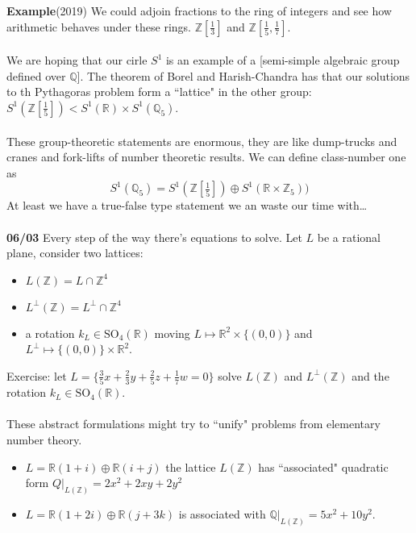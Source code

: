 \documentclass[12pt]{article}
\begin{document}
{\noindent \textbf{Example}(2019) We could adjoin fractions to the ring of integers and see how arithmetic behaves under these rings.  $\mathbb{Z}[\frac{1}{3}]$ and $\mathbb{Z}[\frac{1}{5}, \frac{1}{7}]$.  \\ \\
We are hoping that our cirle $S^1$ is an example of a [semi-simple algebraic group defined over $\mathbb{Q}$].  The theorem of Borel and Harish-Chandra has that our solutions to th Pythagoras problem form a ``lattice" in the other group: $S^1(\mathbb{Z}[\frac{1}{5}]) < S^1(\mathbb{R}) \times S^1(\mathbb{Q}_5)$. \\ \\
These group-theoretic statements are enormous, they are like dump-trucks and cranes and fork-lifts of number theoretic results.  We can define {\color{green!70!black} class-number one} as 
$$ S^1(\mathbb{Q}_5) = S^1(\mathbb{Z}[\tfrac{1}{5}]) \oplus  S^1(\mathbb{R} \times \mathbb{Z}_5)) $$
At least we have a true-false type statement we an waste our time with\dots \\ \\
\textbf{06/03} Every step of the way there's equations to solve.  Let $L$ be a rational plane, consider two lattices:
\begin{itemize}
\item $L(\mathbb{Z}) = L \cap \mathbb{Z}^4$
\item $L^\perp (\mathbb{Z}) = L^\perp \cap \mathbb{Z}^4$
\item a rotation $k_L \in \text{SO}_4(\mathbb{R})$ moving $L \mapsto \mathbb{R}^2 \times \{ (0,0)\}$ and $L^\perp \mapsto \{ (0,0)\} \times \mathbb{R}^2$.
\end{itemize} 
Exercise: let $L = \{ \frac{3}{5} x + \frac{2}{3}y + \frac{2}{5}z + \frac{1}{7}w = 0 \}$ solve $L(\mathbb{Z})$ and $L^\perp(\mathbb{Z})$ and the rotation $k_L \in \text{SO}_4(\mathbb{R})$. \\ \\
These abstract formulations might try to ``unify" problems from elementary number theory.  
\begin{itemize}
\item $L = \mathbb{R}(1+i)\oplus \mathbb{R}(i+j) $ the lattice $L(\mathbb{Z})$ has ``associated" quadratic form $Q|_{L(\mathbb{Z})} = 2x^2 + 2xy + 2y^2$
\item $L = \mathbb{R}(1+2i)\oplus \mathbb{R}(j+3k)$ is associated with $\mathbb{Q}|_{L(\mathbb{Z})} = 5x^2 + 10y^2$.
\end{itemize}

}
\end{document}
